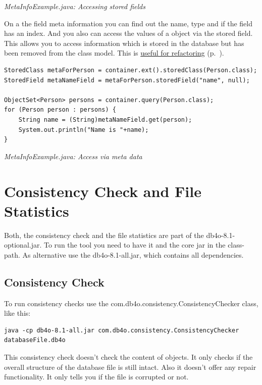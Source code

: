 {\small\itshape MetaInfoExample.java: Accessing stored fields\par}
\medskip

On a the field meta information you can find out the name, type and if the field has an index. And you also can access the values of a object via the stored field. This allows you to access information which is stored in the database but has been removed from the class model. This is \hyperref[ref:advanced-topics-refactoring-and-schema-evolution-field-type-change]{useful for refactoring} (p.~\pageref{ref:advanced-topics-refactoring-and-schema-evolution-field-type-change}).

\begin{lstlisting}
StoredClass metaForPerson = container.ext().storedClass(Person.class);
StoredField metaNameField = metaForPerson.storedField("name", null);

ObjectSet<Person> persons = container.query(Person.class);
for (Person person : persons) {
    String name = (String)metaNameField.get(person);
    System.out.println("Name is "+name);
}
\end{lstlisting}

{\small\itshape MetaInfoExample.java: Access via meta data\par}
\medskip

\section{Consistency Check and File Statistics}
\label{ref:advanced-topics-consistency-check}

Both, the consistency check and the file statistics are part of the db4o-8.1-optional.jar. To run the tool you need to have it and the core jar in the class-path. As alternative use the db4o-8.1-all.jar, which contains all dependencies.

\subsection*{Consistency Check}

To run consistency checks use the com.db4o.consistency.ConsistencyChecker class, like this:

\begin{lstlisting}
java -cp db4o-8.1-all.jar com.db4o.consistency.ConsistencyChecker databaseFile.db4o
\end{lstlisting}

This consistency check doesn't check the content of objects. It only checks if the overall structure of the database file is still intact. Also it doesn't offer any repair functionality. It only tells you if the file is corrupted or not.

